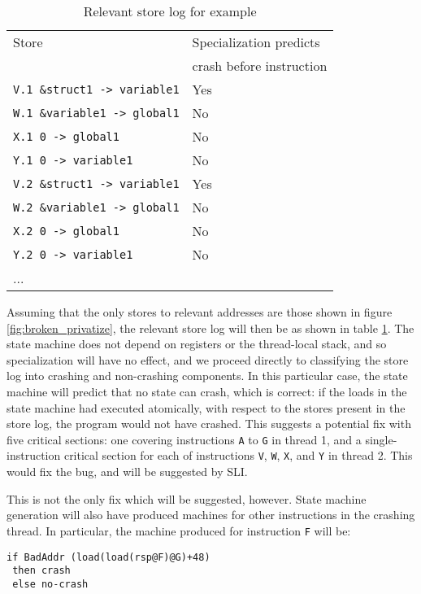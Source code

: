 \documentclass[10pt,twocolumn,preprint,natbib,authoryear]{sigplanconf}
\newcommand{\editorial}[1]{}
\begin{document}
\begin{table}
\begin{tabular}{ll}
 Store & Specialization predicts \\
       & crash before instruction \\
\verb|V.1 &struct1 -> variable1| & Yes\\
\verb|W.1 &variable1 -> global1| & No\\
\verb|X.1 0 -> global1| & No\\
\verb|Y.1 0 -> variable1| & No\\
\verb|V.2 &struct1 -> variable1| & Yes\\
\verb|W.2 &variable1 -> global1| & No\\
\verb|X.2 0 -> global1| & No\\
\verb|Y.2 0 -> variable1| & No\\
...
\end{tabular}
\caption{Relevant store log for example}
\label{tab:relevant_stores}
\end{table}

Assuming that the only stores to relevant addresses are those shown in
figure \ref{fig:broken_privatize}, the relevant store log will then be
as shown in table \ref{tab:relevant_stores}.  The state machine does
not depend on registers or the thread-local stack, and so
specialization will have no effect, and we proceed directly to
classifying the store log into crashing and non-crashing components.
In this particular case, the state machine will predict that no state
can crash, which is correct: if the loads in the state machine had
executed atomically, with respect to the stores present in the store
log, the program would not have crashed.  This suggests a potential
fix with five critical sections: one covering instructions \verb|A| to
\verb|G| in thread 1, and a single-instruction critical section for
each of instructions \verb|V|, \verb|W|, \verb|X|, and \verb|Y| in
thread 2.  This would fix the bug, and will be suggested by
SLI.\editorial{Not a minimal fix...}

This is not the only fix which will be suggested, however.  State
machine generation will also have produced machines for other
instructions in the crashing thread.  In particular, the machine
produced for instruction \verb|F| will be:

\begin{verbatim}
if BadAddr (load(load(rsp@F)@G)+48)
 then crash
 else no-crash
\end{verbatim}
\end{document}
